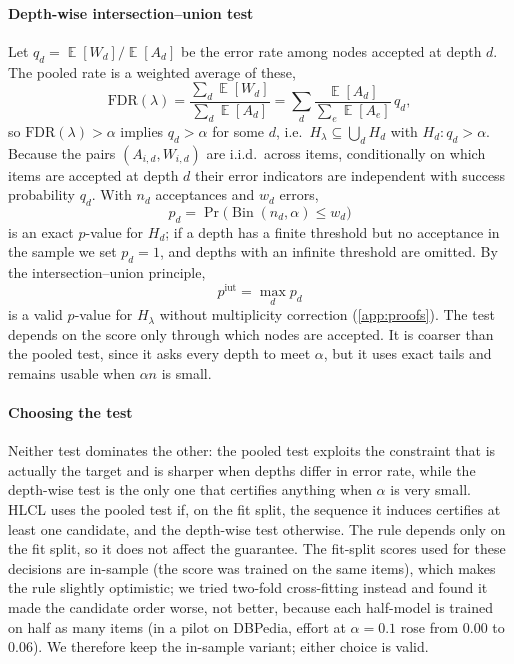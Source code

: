 \documentclass[preprint,12pt]{elsarticle}
\theoremstyle{definition}
\theoremstyle{remark}
\newcommand{\hlcl}{\textup{\textsc{HLCL}}}
\newcommand{\fdr}{\mathrm{FDR}}
\DeclareMathOperator{\E}{\mathbb{E}}
\DeclareMathOperator{\Bin}{Bin}
\begin{document}
\paragraph{Depth-wise intersection--union test}
Let $q_d=\E[W_d]/\E[A_d]$ be the error rate among nodes accepted at depth $d$.
The pooled rate is a weighted average of these,
\begin{equation}
  \fdr(\lambda)=\frac{\sum_d\E[W_d]}{\sum_d\E[A_d]}
  =\sum_d\frac{\E[A_d]}{\sum_e\E[A_e]}\,q_d ,
  \label{eq:weightedavg}
\end{equation}
so $\fdr(\lambda)>\alpha$ implies $q_d>\alpha$ for some $d$, i.e.\
$H_\lambda\subseteq\bigcup_d H_d$ with $H_d:q_d>\alpha$. Because the pairs
$(A_{i,d},W_{i,d})$ are i.i.d.\ across items, conditionally on which items are
accepted at depth $d$ their error indicators are independent with success
probability $q_d$. With $n_d$ acceptances and $w_d$ errors,
\begin{equation}
  p_d=\Pr\bigl(\Bin(n_d,\alpha)\le w_d\bigr)
  \label{eq:binomial}
\end{equation}
is an exact $p$-value for $H_d$; if a depth has a finite threshold but no
acceptance in the sample we set $p_d=1$, and depths with an infinite threshold
are omitted. By the intersection--union principle,
\begin{equation}
  p^{\mathrm{iut}}=\max_d p_d
  \label{eq:iut}
\end{equation}
is a valid $p$-value for $H_\lambda$ without multiplicity correction
(\ref{app:proofs}). The test depends on the score only through which nodes are
accepted. It is coarser than the pooled test, since it asks every depth to meet
$\alpha$, but it uses exact tails and remains usable when $\alpha n$ is small.

\paragraph{Choosing the test}
Neither test dominates the other: the pooled test exploits the constraint that
is actually the target and is sharper when depths differ in error rate, while
the depth-wise test is the only one that certifies anything when $\alpha$ is
very small. \hlcl{} uses the pooled test if, on the fit split, the sequence it
induces certifies at least one candidate, and the depth-wise test otherwise.
The rule depends only on the fit split, so it does not affect the guarantee.
The fit-split scores used for these decisions are in-sample (the score was
trained on the same items), which makes the rule slightly optimistic; we tried
two-fold cross-fitting instead and found it made the candidate order worse, not
better, because each half-model is trained on half as many items (in a pilot on
DBPedia, effort at $\alpha=0.1$ rose from $0.00$ to $0.06$). We therefore keep
the in-sample variant; either choice is valid.
\end{document}
